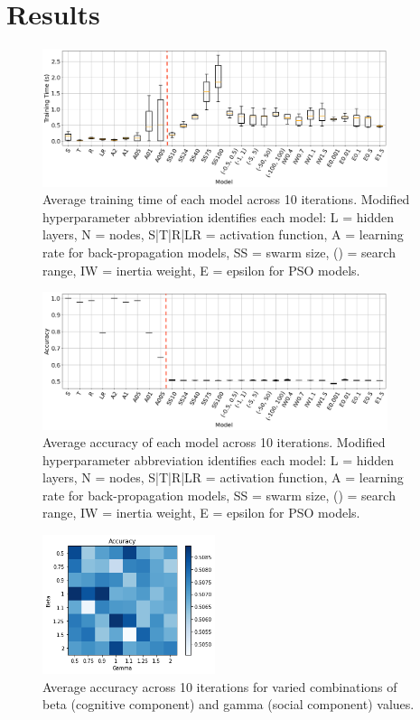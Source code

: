 \documentclass[12pt]{article}
\begin{document}
\vspace{-1.5em}
\section{Results}


\begin{figure}[H]
  \centering
  \includegraphics[width=0.9\textwidth]{figs/combo_ttime.png}
  \caption{
    Average training time of each model across 10 iterations.
    Modified hyperparameter abbreviation identifies each model:
    L = hidden layers, N = nodes, S|T|R|LR = activation function,
    A = learning rate for back-propagation models, SS = swarm size, () = search range, IW = inertia weight, E = epsilon for PSO models.
  }
  \label{fig:ttime}
\end{figure}

\begin{figure}[H]
  \centering
  \includegraphics[width=0.9\textwidth]{figs/combo_acc.png}
  \caption{
    Average accuracy of each model across 10 iterations.
    Modified hyperparameter abbreviation identifies each model:
    L = hidden layers, N = nodes, S|T|R|LR = activation function,
    A = learning rate for back-propagation models, SS = swarm size, () = search range, IW = inertia weight, E = epsilon for PSO models.
  }
  \label{fig:accuracy}
\end{figure}


\begin{figure}[H]
  \centering
  \includegraphics[width=0.45\textwidth]{figs/beta_gamma.png}
  \caption{
    Average accuracy across 10 iterations for varied combinations of beta (cognitive component) and gamma (social component) values.
  }
  \label{fig:bg}
\end{figure}
\end{document}
